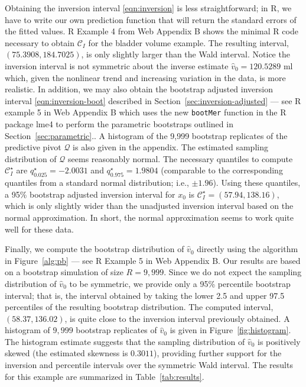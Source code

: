 \documentclass[useAMS,usenatbib,usegraphicx,referee]{biom}\usepackage[]{graphicx}\usepackage[]{color}
\newcommand{\boot}{\star}
\newcommand{\code}[1]{\texttt{#1}}
\newcommand{\proglang}[1]{\textsf{#1}}
\newcommand{\pkg}[1]{{\fontseries{b}\selectfont #1}}
\begin{document}
Obtaining the inversion interval \eqref{eqn:inversion} is less straightforward; in \proglang{R}, we have to write our own prediction function that will return the standard errors of the fitted values. R Example 4 from Web Appendix B shows the minimal \proglang{R} code necessary to obtain $\mathcal{C}_I$ for the bladder volume example. The resulting interval, $(75.3908, 184.7025)$, is only slightly larger than the Wald interval. Notice the inversion interval is not symmetric about the inverse estimate $\widehat{v}_0 = 120.5289 \text{ ml}$ which, given the nonlinear trend and increasing variation in the data, is more realistic. In addition, we may also obtain the bootstrap adjusted inversion interval \eqref{eqn:inversion-boot} described in Section~\ref{sec:inversion-adjusted} --- see R example 5 in Web Appendix B which uses the new \code{bootMer} function in the \proglang{R} package \pkg{lme4} to perform the parametric bootstraps outlined in Section~\ref{sec:parametric}.. A histogram of the 9,999 bootstrap replicates of the predictive pivot $\mathcal{Q}$ is also given in the appendix. The estimated sampling distribution of $\mathcal{Q}$ seems reasonably normal. The necessary quantiles to compute $\mathcal{C}^\boot_I$ are $q^\boot_{0.025} = -2.0031$ and $q^\boot_{0.975} = 1.9804$ (comparable to the corresponding quantiles from a standard normal distribution; i.e., $\pm 1.96$). Using these quantiles, a 95\% bootstrap adjusted inversion interval for $x_0$ is $\mathcal{C}^\boot_I = (57.94, 138.16)$, which is only slightly wider than the unadjusted inversion interval based on the normal approximation. In short, the normal approximation seems to work quite well for these data. 

Finally, we compute the bootstrap distribution of $\widehat{v}_0$ directly using the algorithm in Figure~\ref{alg:pb} --- see R Example 5 in Web Appendix B. Our results are based on a bootstrap simulation of size $R = 9,999$. Since we do not expect the sampling distribution of $\widehat{v}_0$ to be symmetric, we provide only a 95\% percentile bootstrap interval; that is, the interval obtained by taking the lower 2.5 and upper 97.5 percentiles of the resulting bootstrap distribution. The computed interval, $(58.37, 136.02)$, is quite close to the inversion interval previously obtained. A histogram of $9,999$ bootstrap replicates of $\widehat{v}_0$ is given in Figure~\ref{fig:histogram}. The histogram estimate suggests that the sampling distribution of $\widehat{v}_0$ is positively skewed (the estimated skewness is $0.3011$), providing further support for the inversion and percentile intervals over the symmetric Wald interval. The results for this example are summarized in Table~\ref{tab:results}.
\end{document}
